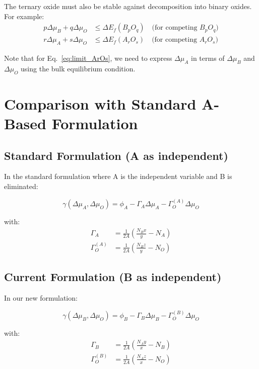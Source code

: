 \documentclass[11pt]{article}
\begin{document}
The ternary oxide must also be stable against decomposition into binary oxides. For example:
\begin{align}
p\Delta\mu_B + q\Delta\mu_O &\leq \Delta E_f(B_pO_q) \quad \text{(for competing } B_pO_q) \label{eq:limit_BpOq} \\
r\Delta\mu_A + s\Delta\mu_O &\leq \Delta E_f(A_rO_s) \quad \text{(for competing } A_rO_s) \label{eq:limit_ArOs}
\end{align}

Note that for Eq.~\ref{eq:limit_ArOs}, we need to express $\Delta\mu_A$ in terms of $\Delta\mu_B$ and $\Delta\mu_O$ using the bulk equilibrium condition.

\section{Comparison with Standard A-Based Formulation}

\subsection{Standard Formulation (A as independent)}

In the standard formulation where A is the independent variable and B is eliminated:

\begin{equation}
\gamma(\Delta\mu_A, \Delta\mu_O) = \phi_A - \Gamma_A \Delta\mu_A - \Gamma_O^{(A)} \Delta\mu_O
\end{equation}

with:
\begin{align}
\Gamma_A &= \frac{1}{2A} \left(\frac{N_B x}{y} - N_A\right) \\
\Gamma_O^{(A)} &= \frac{1}{2A} \left(\frac{N_B z}{y} - N_O\right)
\end{align}

\subsection{Current Formulation (B as independent)}

In our new formulation:

\begin{equation}
\gamma(\Delta\mu_B, \Delta\mu_O) = \phi_B - \Gamma_B \Delta\mu_B - \Gamma_O^{(B)} \Delta\mu_O
\end{equation}

with:
\begin{align}
\Gamma_B &= \frac{1}{2A} \left(\frac{N_A y}{x} - N_B\right) \\
\Gamma_O^{(B)} &= \frac{1}{2A} \left(\frac{N_A z}{x} - N_O\right)
\end{align}
\end{document}
